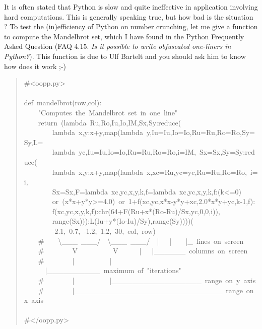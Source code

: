 \documentclass[10pt,english]{article}
\begin{document}
It is often stated that Python is slow and quite ineffective
in application involving hard computations. This is generally speaking
true, but how bad is the situation ? To test the (in)efficiency of
Python on number crunching, let me give a function to compute the
Mandelbrot set, which I have found in the Python Frequently Asked
Question (FAQ 4.15. \emph{Is it possible to write obfuscated one-liners 
in Python?}).
This function is due to Ulf Bartelt and you should ask him to know how
does it work ;-)
\begin{quote}
\begin{ttfamily}\begin{flushleft}
\mbox{{\#}<oopp.py>}\\
\mbox{}\\
\mbox{def~mandelbrot(row,col):}\\
\mbox{~~~~"Computes~the~Mandelbrot~set~in~one~line"}\\
\mbox{~~~~return~(lambda~Ru,Ro,Iu,Io,IM,Sx,Sy:reduce(}\\
\mbox{~~~~~~~~lambda~x,y:x+y,map(lambda~y,Iu=Iu,Io=Io,Ru=Ru,Ro=Ro,Sy=Sy,L=}\\
\mbox{~~~~~~~~lambda~yc,Iu=Iu,Io=Io,Ru=Ru,Ro=Ro,i=IM,~Sx=Sx,Sy=Sy:reduce(}\\
\mbox{~~~~~~~~lambda~x,y:x+y,map(lambda~x,xc=Ru,yc=yc,Ru=Ru,Ro=Ro,~i=i,}\\
\mbox{~~~~~~~~Sx=Sx,F=lambda~xc,yc,x,y,k,f=lambda~xc,yc,x,y,k,f:(k<=0)}\\
\mbox{~~~~~~~~or~(x*x+y*y>=4.0)~or~1+f(xc,yc,x*x-y*y+xc,2.0*x*y+yc,k-1,f):}\\
\mbox{~~~~~~~~f(xc,yc,x,y,k,f):chr(64+F(Ru+x*(Ro-Ru)/Sx,yc,0,0,i)),}\\
\mbox{~~~~~~~~range(Sx))):L(Iu+y*(Io-Iu)/Sy),range(Sy))))(}\\
\mbox{~~~~~~~~-2.1,~0.7,~-1.2,~1.2,~30,~col,~row)}\\
\mbox{~~~~{\#}~~~~{\textbackslash}{\_}{\_}{\_}~{\_}{\_}{\_}/~~{\textbackslash}{\_}{\_}{\_}~{\_}{\_}{\_}/~~|~~~|~~~~|{\_}~lines~on~screen}\\
\mbox{~~~~{\#}~~~~~~~~V~~~~~~~~~~V~~~~~~|~~~|{\_}{\_}{\_}{\_}{\_}{\_}~columns~on~screen}\\
\mbox{~~~~{\#}~~~~~~~~|~~~~~~~~~~|~~~~~~|{\_}{\_}{\_}{\_}{\_}{\_}{\_}{\_}{\_}{\_}~maximum~of~"iterations"}\\
\mbox{~~~~{\#}~~~~~~~~|~~~~~~~~~~|{\_}{\_}{\_}{\_}{\_}{\_}{\_}{\_}{\_}{\_}{\_}{\_}{\_}{\_}{\_}{\_}{\_}~range~on~y~axis}\\
\mbox{~~~~{\#}~~~~~~~~|{\_}{\_}{\_}{\_}{\_}{\_}{\_}{\_}{\_}{\_}{\_}{\_}{\_}{\_}{\_}{\_}{\_}{\_}{\_}{\_}{\_}{\_}{\_}{\_}{\_}{\_}{\_}{\_}~range~on~x~axis}\\
\mbox{~~~~}\\
\mbox{{\#}</oopp.py>}
\end{flushleft}\end{ttfamily}
\end{quote}
\end{document}
